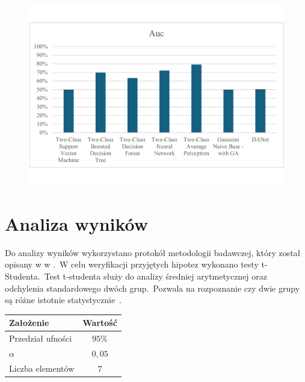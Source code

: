 \begin{figure}[H]
    \centering
    \includegraphics[width=\textwidth]{images/auc-res}
    \label{fig:auc-res}
\end{figure}


\section{Analiza wyników}
Do analizy wyników wykorzystano protokół metodologii badawczej, który został opisany w  w .\ W celu weryfikacji przyjętych hipotez wykonano testy t-Studenta.\ Test t-studenta służy do analizy średniej arytmetycznej oraz odchylenia standardowego dwóch grup.\ Pozwala na rozpoznanie czy dwie grupy są różne istotnie statystycznie~\cite{tstudent}.

\begin{table}[H]
    \centering
    \begin{tabular}{|l|c|}
        \hline
        \textbf{Założenie} & \textbf{Wartość} \\ \hline
        Przedział ufności  & $95\%$           \\ \hline
        $\alpha$           & $0,05$           \\ \hline
        Liczba elementów   & $7$              \\ \hline
    \end{tabular}
    \label{tab:stat}
\end{table}

